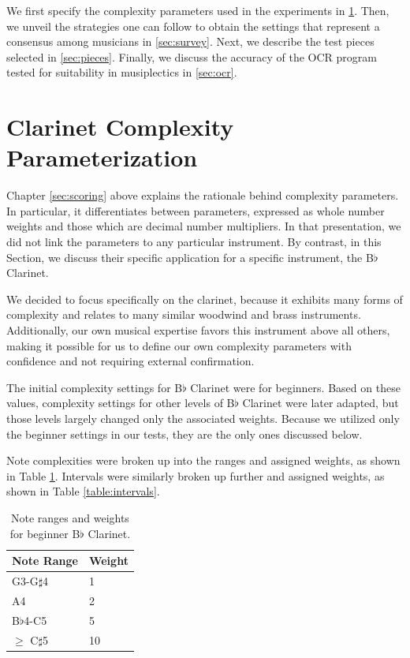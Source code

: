 \documentclass[12pt]{report}
\begin{document}
We first specify the complexity parameters used in the experiments in \ref{sec:settings}. Then, we unveil the strategies one can follow to obtain the settings that represent a consensus among musicians in \ref{sec:survey}. Next, we describe the test pieces selected in \ref{sec:pieces}. Finally, we discuss the accuracy of the OCR program tested for suitability in musiplectics in \ref{sec:ocr}.


\section{Clarinet Complexity Parameterization} 
\label{sec:settings}

Chapter \ref{sec:scoring} above explains the rationale behind complexity parameters. In particular, it differentiates between parameters, expressed as whole number weights and those which are decimal number multipliers. In that presentation, we did not link the parameters to any particular instrument. By contrast, in this Section, we discuss their specific application for a specific instrument, the B$\flat$ Clarinet.

We decided to focus specifically on the clarinet, because it exhibits many forms of complexity and relates to many similar woodwind and brass instruments. Additionally, our own musical expertise favors this instrument above all others, making it possible for us to define our own complexity parameters with confidence and not requiring external confirmation.

The initial complexity settings for B$\flat$ Clarinet were for beginners. Based on these values, complexity settings for other levels of B$\flat$ Clarinet were later adapted, but those levels largely changed only the associated weights. Because we utilized only the beginner settings in our tests, they are the only ones discussed below.

Note complexities were broken up into the ranges and assigned weights, as shown in Table \ref{table:notes}. Intervals were similarly broken up further and assigned weights, as shown in Table \ref{table:intervals}.  

\begin{table}[t]
	\centering
	\caption{Note ranges and weights for beginner B$\flat$ Clarinet.}
    \begin{tabular}{| l | l |}
        \hline
        Note Range & Weight \\ \hline
        G3-G$\sharp$4 & 1 \\ \hline
        A4 & 2 \\ \hline
        B$\flat$4-C5 & 5 \\ \hline
        $\geq$ C$\sharp$5 & 10 \\
        \hline
    \end{tabular}
	\label{table:notes}
\end{table}
\end{document}
